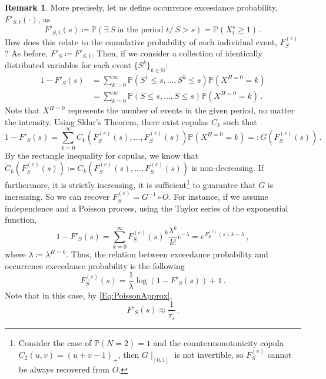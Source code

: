 \documentclass[a4paper,11pt]{extarticle} %
\theoremstyle{definition}
\newtheorem{remarkx}[theorem]{Remark}
\newenvironment{remark}
{\pushQED{\qed}\renewcommand{\qedsymbol}{$\diamond$}\begin{remarkx}}
    {\popQED\end{remarkx}}
\begin{document}
\begin{remark}\label{rem:OEPvsFS}
    More precisely, let us define occurrence exceedance probability, $F'_{S,t}(\cdot)$, as
    \begin{equation}\label{Eq:DefOEP}
        F'_{S,t}(s)\coloneqq \mathbb{P}\left(\exists~S~\text{in the period }t/~S>s\right)=\mathbb{P}\left(X_t^s\ge 1\right)\,.
    \end{equation}
    How does this relate to the cumulative probability of each individual event,  $F^{(e)}_S$? As before, $F'_S\coloneqq F'_{S,1}$. Then, if we consider a collection of identically distributed variables for each event $\{S^k\}_{k\in \mathbb{N}}$:
    \begin{align*}
        1-F'_S(s)&=\sum_{k=0}^{\infty} \mathbb{P}\left(S^1\le s,\ldots, S^k\le s\right)\mathbb{P}\left(X^{H=0}=k\right)\\
        &=\sum_{k=0}^{\infty} \mathbb{P}\left(S\le s,\ldots, S\le s\right)\mathbb{P}\left(X^{H=0}=k\right)\,.
    \end{align*}
Note that $X^{H=0}$ represents the number of events in the given period, no matter the intensity. Using Sklar's Theorem, there exist copulas $C_k$ such that
    \begin{equation*}
        1-F'_S(s)=\sum_{k=0}^{\infty} C_k\left(F^{(e)}_S(s),\ldots, F^{(e)}_S(s)\right)\mathbb{P}\left(X^{H=0}=k\right)=:G(F^{(e)}_S(s))\,.
    \end{equation*}
By the rectangle inequality for copulas, we know that $\tilde{C}_k(F^{(e)}_S(s))\coloneqq C_k\left(F^{(e)}_S(s),\ldots, F^{(e)}_S(s)\right)$ is non-decreasing. If furthermore, it is strictly increasing, it is sufficient\footnote{Consider the case of $\mathbb{P}(N=2)=1$ and the countermonotonicity copula $C_2(u,v)=(u+v-1)_+$, then $G\mid_{[0,1]}$ is not invertible, so $F^{(e)}_S$ cannot be always recovered from $O$.} to guarantee that $G$ is increasing. So we can recover $F^{(e)}_S=G^{-1}\circ O$. For instance, if we assume independence and a Poisson process, using the Taylor series of the exponential function,
\begin{equation}
    1-F'_S(s) = \sum_{k=0}^{\infty}F^{(e)}_S(s)^k \frac{\lambda^k}{k!}e^{-\lambda}=e^{F^{(e)}_S(s)\lambda -\lambda}\,,
\end{equation}
where $\lambda\coloneqq \lambda^{H=0}$. Thus, the relation between exceedance probability and occurrence exceedance probability is the following
$$
F^{(e)}_S(s)=\frac1\lambda\log\left(1-F'_S(s)\right)+1\,.
$$
Note that in this case, by \eqref{Eq:PoissonApprox},
$$
F'_S(s)\approx\frac1{\tau_s}\,.
$$
\end{remark}
\end{document}
